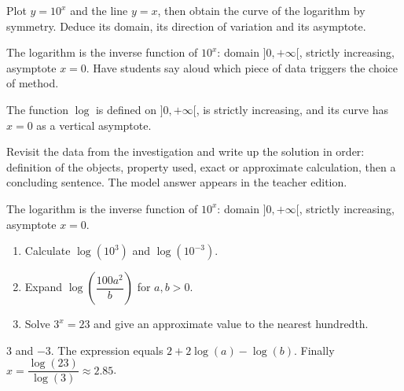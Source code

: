 \begin{activity}
Plot $y=10^x$ and the line $y=x$, then obtain the curve of the logarithm by symmetry. Deduce its domain, its direction of variation and its asymptote.
\begin{center}\end{center}
\end{activity}
\begin{solution}The logarithm is the inverse function of $10^x$: domain $]0,+\infty[$, strictly increasing, asymptote $x=0$. Have students say aloud which piece of data triggers the choice of method.\end{solution}

\begin{summary}The function $\log$ is defined on $]0,+\infty[$, is strictly increasing, and its curve has $x=0$ as a vertical asymptote.\end{summary}

\begin{example}
Revisit the data from the investigation and write up the solution in order: definition of the objects, property used, exact or approximate calculation, then a concluding sentence. The model answer appears in the teacher edition.
\end{example}
\begin{solution}The logarithm is the inverse function of $10^x$: domain $]0,+\infty[$, strictly increasing, asymptote $x=0$.\end{solution}

\begin{exercise}[essential]
\begin{enumerate}\item Calculate $\log(10^3)$ and $\log(10^{-3})$.\item Expand $\log\!\left(\dfrac{100a^2}{b}\right)$ for $a,b>0$.\item Solve $3^x=23$ and give an approximate value to the nearest hundredth.\end{enumerate}
\end{exercise}
\begin{solution}$3$ and $-3$. The expression equals $2+2\log(a)-\log(b)$. Finally $x=\dfrac{\log(23)}{\log(3)}\approx\num{2,85}$.\end{solution}

